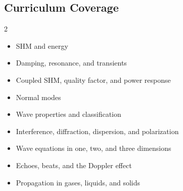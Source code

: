 \documentclass[10pt,a4paper,full]{physicsquiz}
\begin{document}
\hypersetup{pageanchor=false}
\makequiztitle
\hypersetup{pageanchor=true}

\begin{quizreferencecontent}
\section*{Curriculum Coverage}
\begin{multicols}{2}
\begin{itemize}[leftmargin=*]
  \item SHM and energy
  \item Damping, resonance, and transients
  \item Coupled SHM, quality factor, and power response
  \item Normal modes
  \item Wave properties and classification
  \item Interference, diffraction, dispersion, and polarization
  \item Wave equations in one, two, and three dimensions
  \item Echoes, beats, and the Doppler effect
  \item Propagation in gases, liquids, and solids
\end{itemize}
\end{multicols}
\end{quizreferencecontent}
\end{document}
